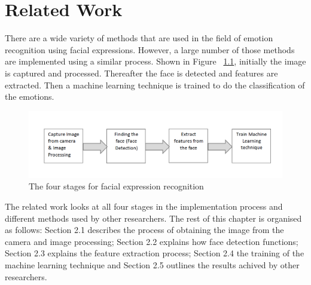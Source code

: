 \chapter{Related Work}

There are a wide variety of methods that are used in the field of emotion recognition using facial expressions. However, a large number of those methods are implemented using a similar process. Shown in Figure ~\ref{fig:process}, initially the image is captured and processed. Thereafter the face is detected and features are extracted. Then a machine learning technique is trained to do the classification of the emotions. 

\begin{figure}[ht]
  \centering
  \includegraphics[scale=0.4]{4}
  \caption{The four stages for facial expression recognition}
  \label{fig:process}
\end{figure}
The related work looks at all four stages in the implementation process and different methods used by other researchers. The rest of this chapter is organised as follows: Section 2.1 describes the process of obtaining the image from the camera and image processing; Section 2.2 explains how face detection functions; Section 2.3 explains the feature extraction process; Section 2.4 the training of the machine learning technique and Section 2.5 outlines the results achived by other researchers.
